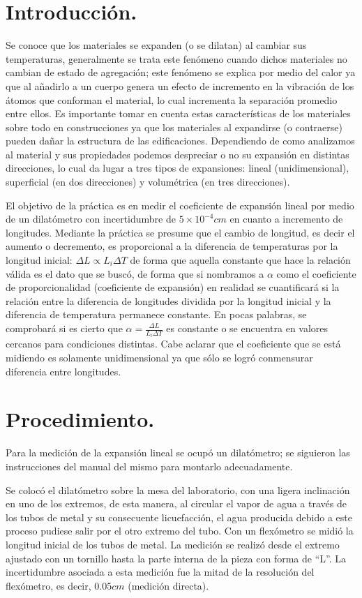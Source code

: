 \documentclass[a4paper]{article}
\begin{document}
\section*{Introducción.}
Se conoce que los materiales se expanden (o se dilatan) al cambiar sus temperaturas, generalmente se trata este fenómeno cuando dichos materiales no cambian de estado de agregación; este fenómeno se explica por medio del calor ya que al añadirlo a un cuerpo genera un efecto de incremento en la vibración de los átomos que conforman el material, lo cual incrementa la separación promedio entre ellos. Es importante tomar en cuenta estas características de los materiales sobre todo en construcciones ya que los materiales al expandirse (o contraerse) pueden dañar la estructura de las edificaciones. Dependiendo de como analizamos al material y sus propiedades podemos despreciar o no su expansión en distintas direcciones, lo cual da lugar a tres tipos de expansiones: lineal (unidimensional), superficial (en dos direcciones) y volumétrica (en tres direcciones). 

El objetivo de la práctica es en medir el coeficiente de expansión lineal por medio de un dilatómetro con incertidumbre de $5\times10^{-4} cm$ en cuanto a incremento de longitudes. Mediante la práctica se presume que el cambio de longitud, es decir el aumento o decremento, es proporcional a la diferencia de temperaturas por la longitud inicial: $\Delta L \propto L_i \Delta T$ de forma que aquella constante que hace la relación válida es el dato que se buscó, de forma que si nombramos a $\alpha$ como el coeficiente de proporcionalidad (coeficiente de expansión) en realidad se cuantificará si la relación entre la diferencia de longitudes dividida por la longitud inicial y la diferencia de temperatura permanece constante. En pocas palabras, se comprobará si es cierto que $\alpha = \frac{\Delta L}{L_i \Delta T}$ es constante o se encuentra en valores cercanos para condiciones distintas. Cabe aclarar que el coeficiente que se está midiendo es solamente unidimensional ya que sólo se logró conmensurar diferencia entre longitudes.


\section*{Procedimiento.}
Para la medición de la expansión lineal se ocupó un dilatómetro; se siguieron las instrucciones del manual del mismo para montarlo adecuadamente.

Se colocó el dilatómetro sobre la mesa del laboratorio, con una ligera inclinación en uno de los extremos, de esta manera, al circular el vapor de agua a través de los tubos de metal y su consecuente licuefacción, el agua producida debido a este proceso pudiese salir por el otro extremo del tubo. Con un flexómetro se midió la longitud inicial de los tubos de metal. La medición se realizó desde el extremo ajustado con un tornillo hasta la parte interna de la pieza con forma de “L”. La incertidumbre asociada a esta medición fue la mitad de la resolución del flexómetro, es decir, $0.05 cm$ (medición directa).
\end{document}
